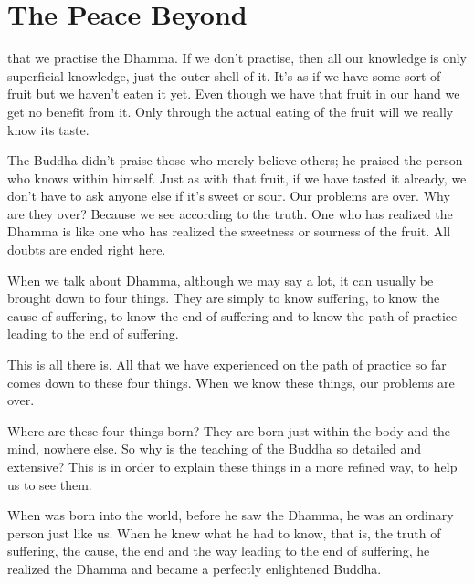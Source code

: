 
\chapter{The Peace Beyond}

 that we practise the Dhamma. If we don't practise, then all our knowledge is only superficial knowledge, just the outer shell of it. It's as if we have some sort of fruit but we haven't eaten it yet. Even though we have that fruit in our hand we get no benefit from it. Only through the actual eating of the fruit will we really know its taste.

The Buddha didn't praise those who merely believe others; he praised the person who knows within himself. Just as with that fruit, if we have tasted it already, we don't have to ask anyone else if it's sweet or sour. Our problems are over. Why are they over? Because we see according to the truth. One who has realized the Dhamma is like one who has realized the sweetness or sourness of the fruit. All doubts are ended right here.

When we talk about Dhamma, although we may say a lot, it can usually be brought down to four things. They are simply to know suffering, to know the cause of suffering, to know the end of suffering and to know the path of practice leading to the end of suffering.

This is all there is. All that we have experienced on the path of practice so far comes down to these four things. When we know these things, our problems are over.

Where are these four things born? They are born just within the body and the mind, nowhere else. So why is the teaching of the Buddha so detailed and extensive? This is in order to explain these things in a more refined way, to help us to see them.

When  was born into the world, before he saw the Dhamma, he was an ordinary person just like us. When he knew what he had to know, that is, the truth of suffering, the cause, the end and the way leading to the end of suffering, he realized the Dhamma and became a perfectly enlightened Buddha.

